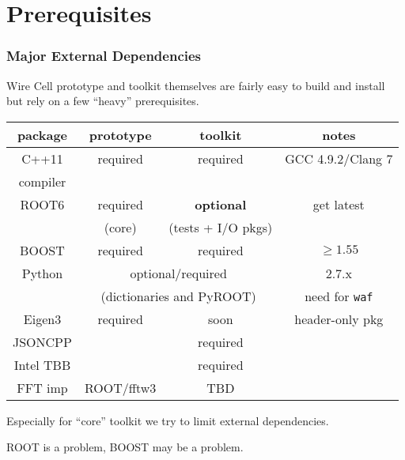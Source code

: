 \documentclass[xcolor=dvipsnames]{beamer}
\newcommand{\xmark}{\ding{55}}%
\begin{document}




\section{Prerequisites}

\begin{frame}
  \frametitle{Major External Dependencies}

  Wire Cell prototype and toolkit themselves are fairly easy to
  build and install but rely on a few ``heavy'' prerequisites.

  \begin{center}\footnotesize
    \begin{tabular}[h]{|c|c|c|c|}
      \hline
      package & prototype & toolkit & notes \\
      \hline
      C++11 & required & required & GCC 4.9.2/Clang 7\\
      compiler & & & \\
      \hline
      ROOT6 & required & \textbf{optional} & get latest \\
            & (core) &  (tests + I/O pkgs) & \\
      \hline
      BOOST & required  & required & $\ge 1.55$\\
      \hline
      Python &  \multicolumn{2}{c|}{optional/required} & 2.7.x\\
      & \multicolumn{2}{c|}{(dictionaries and PyROOT)} & need for \texttt{waf} \\
      \hline
      Eigen3 & required & soon & header-only pkg\\
      \hline
      JSONCPP & \xmark & required & \\
      \hline
      Intel TBB & \xmark & required & \\
      \hline
      FFT imp & ROOT/fftw3 & TBD & \\
      \hline
    \end{tabular}
  \end{center}
  Especially for ``core'' toolkit we try to limit external dependencies.

  ROOT is a problem, BOOST may be a problem.
\end{frame}
\end{document}
